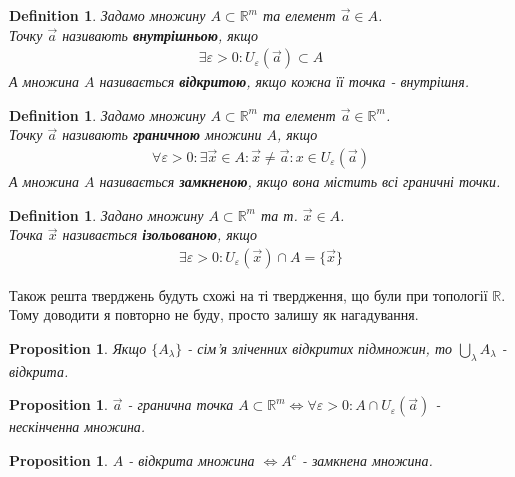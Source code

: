 \documentclass[a4paper, 10pt]{article}
\def\huge{\displaystyle}
\theoremstyle{theoremdd}
\theoremstyle{theoremdd}
\newtheorem{definition}[theorem]{Definition}
\theoremstyle{theoremdd}
\theoremstyle{theoremdd}
\theoremstyle{theoremdd}
\newtheorem{proposition}[theorem]{Proposition}
\theoremstyle{theoremdd}
\theoremstyle{theoremdd}
\theoremstyle{theoremdd}
\begin{document}
\begin{definition}
Задамо множину $A \subset \mathbb{R}^m$ та елемент $\vec{a} \in A$.\\
Точку $\vec{a}$ називають \textbf{внутрішньою}, якщо
\begin{align*}
\exists \varepsilon > 0: U_\varepsilon (\vec{a}) \subset A
\end{align*}
А множина $A$ називається \textbf{відкритою}, якщо кожна її точка - внутрішня.
\end{definition}

\begin{definition}
Задамо множину $A \subset \mathbb{R}^m$ та елемент $\vec{a} \in \mathbb{R}^m$.\\
Точку $\vec{a}$ називають \textbf{граничною} множини $A$, якщо
\begin{align*}
\forall \varepsilon > 0: \exists \vec{x} \in A: \vec{x} \neq \vec{a}: x \in U_{\varepsilon}(\vec{a})
\end{align*}
А множина $A$ називається \textbf{замкненою}, якщо вона містить всі граничні точки.
\end{definition}

\begin{definition}
Задано множину $A \subset \mathbb{R}^m$ та т. $\vec{x} \in A$.\\
Точка $\vec{x}$ називається \textbf{ізольованою}, якщо
\begin{align*}
\exists \varepsilon > 0: U_\varepsilon(\vec{x}) \cap A = \{\vec{x}\}
\end{align*}
\end{definition}

Також решта тверджень будуть схожі на ті твердження, що були при топології $\mathbb{R}$. Тому доводити я повторно не буду, просто залишу як нагадування.
\begin{proposition}
Якщо $\{A_\lambda\}$ - сім'я зліченних відкритих підмножин, то $\huge\bigcup_\lambda A_\lambda$ - відкрита.
\end{proposition}

\begin{proposition}
$\vec{a}$ - гранична точка $A \subset \mathbb{R}^m \iff \forall \varepsilon > 0: A \cap U_\varepsilon (\vec{a})$ - нескінченна множина.
\end{proposition}

\begin{proposition}
$A$ - відкрита множина $\iff A^c$ - замкнена множина.
\end{proposition}
\end{document}

